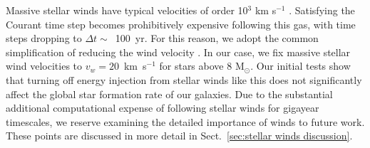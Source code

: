 \documentclass[twocolumn]{aastex61}
\newcommand{\ccunit}{cm$^{-3}$}
\begin{document}
Massive stellar winds have typical velocities of order 10$^{3}$ km s$^{-1}$ \citep{Leitherer1992}. Satisfying the Courant time step becomes prohibitively expensive following this gas, with time steps dropping to $\Delta t \sim$~100~yr. For this reason, we adopt the common simplification of reducing the wind velocity \citep[e.g][]{Offner2015}. In our case, we fix massive stellar wind velocities to $v_w = 20$~km~s$^{-1}$ for stars above 8 M$_{\odot}$. Our initial tests show that turning off energy injection from stellar winds like this does not significantly affect the global star formation rate of our galaxies. Due to the substantial additional computational expense of following stellar winds for gigayear timescales, we reserve examining the detailed importance of winds to future work. These points are discussed in more detail in Sect.~\ref{sec:stellar winds discussion}.


\end{document}
